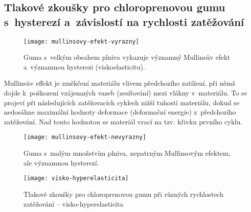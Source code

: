 
\subsection{Tlakové zkoušky pro chloroprenovou gumu s~hysterezí a~závislostí na rychlosti zatěžování}
\begin{figure}[H]
	\centering
	\texttt{[image: mullinsovy-efekt-vyrazny]}
	\caption{Guma s~velkým obsahem plniva vykazuje významný Mullinsův efekt a~významnou hysterezi (viskoelasticitu).}
	\label{fig:mullinsovy-efekt-vyrazny}
\end{figure}

Mullinsův effekt je změkčení materiálu vlivem předchozího zatížení, při němž dojde k~poškození vzájemných vazeb (zesíťování) mezi vlákny v~materiálu. To se projeví při následujících zatěžovacích cyklech nižší tuhostí materiálu, dokud se nedosáhne maximální hodnoty deformace (deformační energie) z~předchozího zatěžování. Nad touto hodnotou se materiál vrací na tzv.  křivku prvního cyklu.

\begin{figure}[H]
	\centering
	\texttt{[image: mullinsovy-efekt-nevyrazny]}
	\caption{Guma s~malým množstvím plniva, nepatrným Mullinsovým efektem, ale významnou hysterezí.}
	\label{fig:mullinsovy-efekt-nevyrazny}
\end{figure}

\begin{figure}[H]
	\centering
	\texttt{[image: visko-hyperelasticita]}
	\caption{Tlakové zkoušky pro chloroprenovou gumu při různých rychlostech zatěžování -- visko-hyperelasticita}
	\label{fig:visko-hyperelasticita}
\end{figure}
